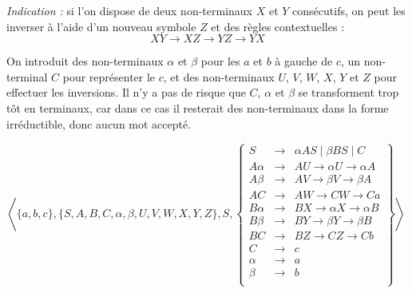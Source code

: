 \begin{exercice}
\begin{questions}
    \emph{Indication :} si l'on dispose de deux non-terminaux $X$ et $Y$ consécutifs,
    on peut les inverser à l'aide d'un nouveau symbole $Z$ et des règles contextuelles :
    $$
    XY \rightarrow XZ \rightarrow YZ \rightarrow YX
    $$
  \end{questions}
  \begin{corrections}
    On introduit des non-terminaux $\alpha$ et $\beta$ pour les $a$ et $b$ à gauche de $c$,
    un non-terminal $C$ pour représenter le $c$,
    et des non-terminaux $U$, $V$, $W$, $X$, $Y$ et $Z$ pour effectuer les inversions.
    Il n’y a pas de risque que $C$, $\alpha$ et $\beta$ se
    transforment trop tôt en terminaux, car dans ce cas il resterait des non-terminaux
    dans la forme irréductible, donc aucun mot accepté.

    $\left\langle \{a, b, c\}, \{S, A, B, C, \alpha, \beta, U, V, W, X, Y, Z\}, S,
    \left\{\begin{array}{rcl}
    S       &\rightarrow& \alpha A S \mid \beta B S \mid C\\
    A\alpha &\rightarrow& AU \rightarrow \alpha U \rightarrow \alpha A\\
    A\beta  &\rightarrow& AV \rightarrow \beta V \rightarrow \beta A\\
    AC      &\rightarrow& AW \rightarrow CW \rightarrow Ca\\
    B\alpha &\rightarrow& BX \rightarrow \alpha X \rightarrow \alpha B\\
    B\beta  &\rightarrow& BY \rightarrow \beta Y \rightarrow \beta B\\
    BC      &\rightarrow& BZ \rightarrow CZ \rightarrow Cb\\
    C      &\rightarrow& c\\
    \alpha &\rightarrow& a\\
    \beta  &\rightarrow& b\\
    \end{array}\right\}  \right\rangle$
  \end{corrections}
\end{exercice}

\endgroup
\endinput
